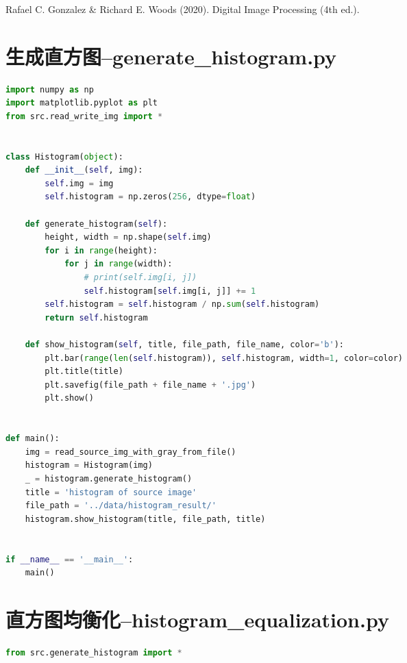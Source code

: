 \documentclass{hitreport}
\begin{document}
\renewcommand\refname{参考文献}
 
\begin{thebibliography}{1}
Rafael C. Gonzalez \& Richard E. Woods (2020). Digital Image Processing (4th ed.).

\end{thebibliography}

\newpage
\begin{appendices}

\section{生成直方图--generate\_histogram.py}\label{app:gen}
\begin{lstlisting}[language=python]
import numpy as np
import matplotlib.pyplot as plt
from src.read_write_img import *


class Histogram(object):
    def __init__(self, img):
        self.img = img
        self.histogram = np.zeros(256, dtype=float)

    def generate_histogram(self):
        height, width = np.shape(self.img)
        for i in range(height):
            for j in range(width):
                # print(self.img[i, j])
                self.histogram[self.img[i, j]] += 1
        self.histogram = self.histogram / np.sum(self.histogram)
        return self.histogram

    def show_histogram(self, title, file_path, file_name, color='b'):
        plt.bar(range(len(self.histogram)), self.histogram, width=1, color=color)
        plt.title(title)
        plt.savefig(file_path + file_name + '.jpg')
        plt.show()


def main():
    img = read_source_img_with_gray_from_file()
    histogram = Histogram(img)
    _ = histogram.generate_histogram()
    title = 'histogram of source image'
    file_path = '../data/histogram_result/'
    histogram.show_histogram(title, file_path, title)


if __name__ == '__main__':
    main()

\end{lstlisting}

\section{直方图均衡化--histogram\_equalization.py}\label{app:hisequ}
\begin{lstlisting}[language=python]
from src.generate_histogram import *



\end{lstlisting}
\end{appendices}
\end{document}
